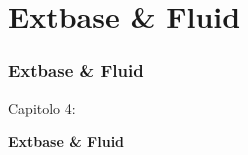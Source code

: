 %

\section{Extbase \& Fluid}
\begin{frame}[fragile]
	\frametitle{Extbase \& Fluid}

	\begin{center}\huge{Capitolo 4:}\end{center}
	\begin{center}\huge{\color{typo3darkgrey}\textbf{Extbase \& Fluid}}\end{center}

\end{frame}


